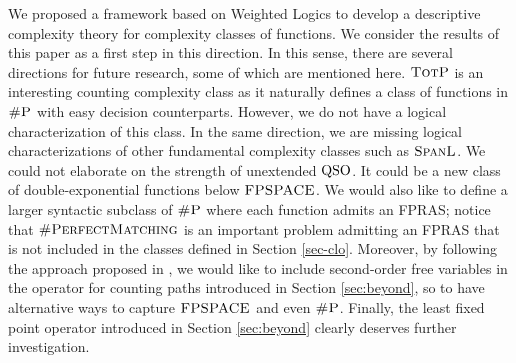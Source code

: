 
We proposed a framework based on Weighted Logics to develop a descriptive complexity theory for complexity classes of functions.
We consider the results of this paper as a first step in this direction.
In this sense, there are several directions for future research, some of which are mentioned here. 
$\text{\sc TotP}$ is an interesting counting complexity class as it naturally defines a class of functions in $\text{\sc \#P}$ with easy decision counterparts. However, we do not have a logical characterization of this class.
In the same direction, we are missing logical characterizations of other fundamental complexity classes such as $\text{\sc SpanL}$. 
We could not elaborate on the strength of unextended ${\rm QSO}$. It could be a new class of double-exponential functions below $\text{\sc FPSPACE}$.
We would also like to define a larger syntactic subclass of $\text{\sc \#P}$ where each function admits an FPRAS; notice that $\textsc{\#PerfectMatching}$ is an important problem admitting an FPRAS\cite{JSV04} that is not included in the classes defined in Section \ref{sec-clo}. Moreover, by following the approach proposed in
\cite{I83}, we would like to include second-order free variables in the operator for counting paths introduced in Section \ref{sec:beyond}, so to have alternative ways to capture $\text{\sc FPSPACE}$ and even $\text{\sc \#P}$. Finally, the least fixed point operator introduced in Section \ref{sec:beyond} clearly deserves further investigation.


